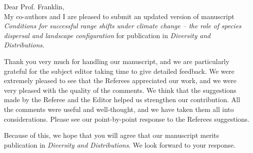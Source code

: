 \documentclass[11pt,stdletter,letterpaper]{newlfm}
\newcommand{\mytitle}{\emph{Conditions for successful range shifts under climate change -- the role of species dispersal and landscape configuration }}
\newcommand{\myjournal}{\emph{Diversity and Distributions}}
\begin{document}
\begin{newlfm}
Dear Prof. Franklin,\\

My co-authors and I are pleased to submit an updated version of manuscript \mytitle for publication in \myjournal. 


Thank you very much for handling our manuscript, and we are particularly grateful for the subject editor taking time to give detailed feedback. We were extremely pleased to see
that the Referees appreciated our work, and we were very pleased with the quality of the
comments. We think that the suggestions made by the Referee and the Editor helped us strengthen
our contribution. All the comments were useful and well-thought, and we have taken
them all into considerations. Please see our point-by-point response to the Referees
suggestions.

Because of this, we hope that you will agree that our manuscript merits publication in \myjournal. We look forward to your response.



\end{newlfm}
\end{document}
